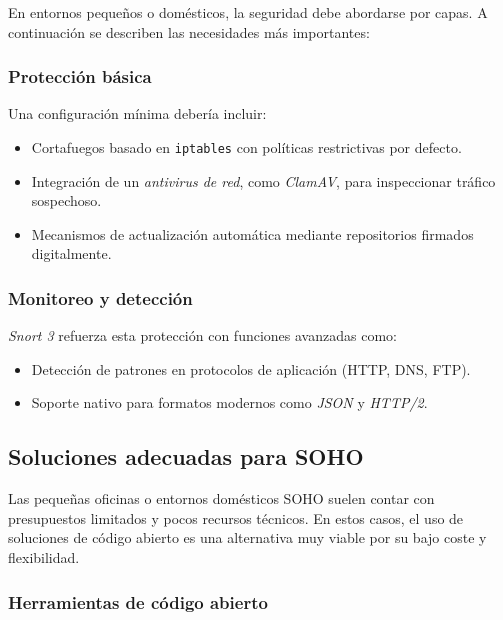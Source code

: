 \documentclass[11pt,a4paper,twoside]{report}
\begin{document}
En entornos pequeños o domésticos, la seguridad debe abordarse por capas. A continuación se describen las necesidades más importantes:

\subsubsection{Protección básica}

Una configuración mínima debería incluir:

\begin{itemize}
	\item Cortafuegos basado en \texttt{iptables} con políticas restrictivas por defecto.
	\item Integración de un \textit{antivirus de red}, como \textit{ClamAV}, para inspeccionar tráfico sospechoso.
	\item Mecanismos de actualización automática mediante repositorios firmados digitalmente.
\end{itemize}

\subsubsection{Monitoreo y detección}

\textit{Snort 3} refuerza esta protección con funciones avanzadas como:

\begin{itemize}
	\item Detección de patrones en protocolos de aplicación (HTTP, DNS, FTP).
	\item Soporte nativo para formatos modernos como \textit{JSON} y \textit{HTTP/2}.
\end{itemize}

\vspace{0.5cm}

\subsection{Soluciones adecuadas para SOHO}

Las pequeñas oficinas o entornos domésticos SOHO suelen contar con presupuestos limitados y pocos recursos técnicos. En estos casos, el uso de soluciones de código abierto es una alternativa muy viable por su bajo coste y flexibilidad.

\subsubsection{Herramientas de código abierto}
\end{document}
